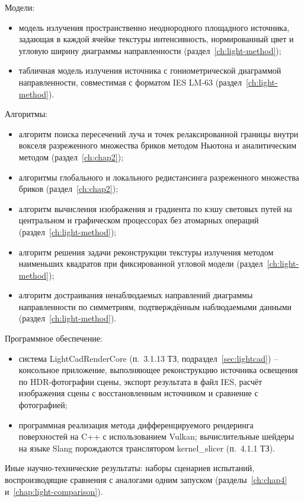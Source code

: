 Модели:
\begin{itemize}
    \item модель излучения пространственно неоднородного площадного источника, задающая в каждой ячейке текстуры интенсивность, нормированный цвет и угловую ширину диаграммы направленности (раздел~\ref{ch:light-method});
    \item табличная модель излучения источника с гониометрической диаграммой направленности, совместимая с форматом IES LM-63 (раздел~\ref{ch:light-method}).
\end{itemize}

Алгоритмы:
\begin{itemize}
    \item алгоритм поиска пересечений луча и точек релаксированной границы внутри вокселя разреженного множества бриков методом Ньютона и аналитическим методом (раздел~\ref{ch:chap2});
    \item алгоритмы глобального и локального редистансинга разреженного множества бриков (раздел~\ref{ch:chap2});
    \item алгоритм вычисления изображения и градиента по кэшу световых путей на центральном и графическом процессорах без атомарных операций (раздел~\ref{ch:light-method});
    \item алгоритм решения задачи реконструкции текстуры излучения методом наименьших квадратов при фиксированной угловой модели (раздел~\ref{ch:light-method});
    \item алгоритм достраивания ненаблюдаемых направлений диаграммы направленности по симметриям, подтверждённым наблюдаемыми данными (раздел~\ref{ch:light-method}).
\end{itemize}

Программное обеспечение:
\begin{itemize}
    \item система LightCadRenderCore (п.~3.1.13 ТЗ, подраздел~\ref{sec:lightcad}) -- консольное приложение, выполняющее реконструкцию источника освещения по HDR-фотографии сцены, экспорт результата в файл IES, расчёт изображения сцены с восстановленным источником и сравнение с фотографией;
    \item программная реализация метода дифференцируемого рендеринга поверхностей на C++ с использованием Vulkan; вычислительные шейдеры на языке Slang порождаются транслятором kernel\_slicer (п.~4.1.1 ТЗ).
\end{itemize}

Иные научно-технические результаты: наборы сценариев испытаний, воспроизводящие сравнения с аналогами одним запуском (разделы~\ref{ch:chap4} и~\ref{chap:light-comparison}).

